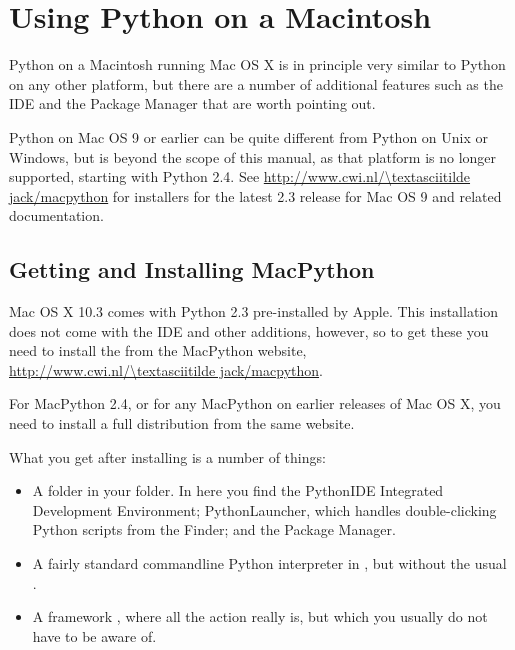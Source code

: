 \chapter{Using Python on a Macintosh \label{using}}

Python on a Macintosh running Mac OS X is in principle very similar to
Python on any other \UNIX platform, but there are a number of additional
features such as the IDE and the Package Manager that are worth pointing out.

Python on Mac OS 9 or earlier can be quite different from Python on
Unix or Windows, but is beyond the scope of this manual, as that platform
is no longer supported, starting with Python 2.4. See
\url{http://www.cwi.nl/\textasciitilde jack/macpython} for installers
for the latest 2.3 release for Mac OS 9 and related documentation.

\section{Getting and Installing MacPython \label{getting-OSX}}

Mac OS X 10.3 comes with Python 2.3 pre-installed by Apple.
This installation does not come with the IDE and other additions, however,
so to get these you need to install the 
from the MacPython website, \url{http://www.cwi.nl/\textasciitilde jack/macpython}.

For MacPython 2.4, or for any MacPython on earlier releases of Mac OS X,
you need to install a full distribution from the same website.

What you get after installing is a number of things:

\begin{itemize}
    \item A  folder in your 
    folder. In here you find the PythonIDE Integrated Development Environment;
    PythonLauncher, which handles double-clicking Python scripts from
    the Finder; and the Package Manager.
    
    \item A fairly standard \UNIX{} commandline Python interpreter in
    , but without the usual
    .
    
    \item A framework , where
    all the action really is, but which you usually do not have to be aware of.
\end{itemize}

